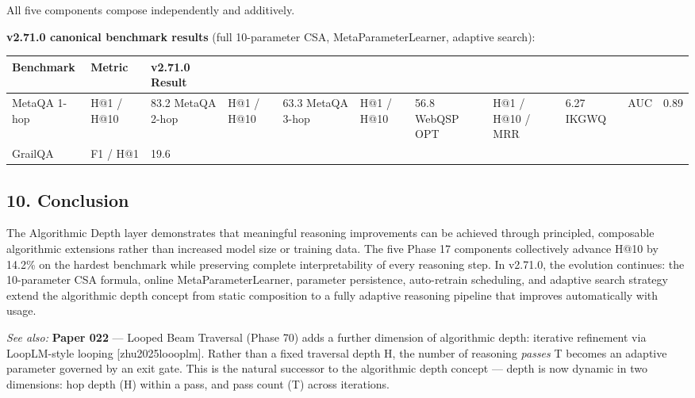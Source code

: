 All five components compose independently and additively.

\textbf{v2.71.0 canonical benchmark results} (full 10-parameter CSA, MetaParameterLearner, adaptive search):

\begin{table}[h]
\small\centering
\begin{tabular}{lll}
\toprule
Benchmark & Metric & v2.71.0 Result \\
\midrule
MetaQA 1-hop & H@1 / H@10 & 83.2%
MetaQA 2-hop & H@1 / H@10 & 63.3%
MetaQA 3-hop & H@1 / H@10 & 56.8%
WebQSP OPT & H@1 / H@10 / MRR & 6.27%
IKGWQ & AUC & 0.89 \\
GrailQA & F1 / H@1 & 19.6%
\bottomrule
\end{tabular}
\end{table}


\subsection*{10. Conclusion}
The Algorithmic Depth layer demonstrates that meaningful reasoning improvements can be achieved through principled, composable algorithmic extensions rather than increased model size or training data. The five Phase 17 components collectively advance H@10 by 14.2\% on the hardest benchmark while preserving complete interpretability of every reasoning step. In v2.71.0, the evolution continues: the 10-parameter CSA formula, online MetaParameterLearner, parameter persistence, auto-retrain scheduling, and adaptive search strategy extend the algorithmic depth concept from static composition to a fully adaptive reasoning pipeline that improves automatically with usage.

\textit{See also:} \textbf{Paper 022} --- Looped Beam Traversal (Phase 70) adds a further dimension of algorithmic depth: iterative refinement via LoopLM-style looping [zhu2025loooplm]. Rather than a fixed traversal depth H, the number of reasoning \textit{passes} T becomes an adaptive parameter governed by an exit gate. This is the natural successor to the algorithmic depth concept --- depth is now dynamic in two dimensions: hop depth (H) within a pass, and pass count (T) across iterations.
